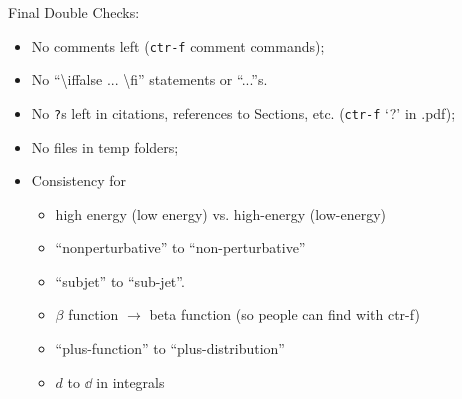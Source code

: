 \begin{sambox}{Final Double Checks:}
\begin{itemize}
    \item
    No comments left (\texttt{ctr-f} comment commands);

    \item
    No ``\textbackslash iffalse ... \textbackslash fi'' statements or ``...''s.

    \item
    No \texttt{?}s left in citations, references to Sections, etc. (\texttt{ctr-f} `?' in .pdf);

    \item
    No files in temp folders;

    \item
    Consistency for
    \begin{itemize}
	\item
	high energy (low energy) vs. high-energy (low-energy)

	\item
	``nonperturbative'' to ``non-perturbative''

	\item
	``subjet'' to ``sub-jet''.

	\item
	\(\beta\) function \(\to\) beta function (so people can find with ctr-f)

	\item
	``plus-function'' to ``plus-distribution''

	\item \(d\) to \(\dd\) in integrals
    \end{itemize}
\end{itemize}
\end{sambox}
